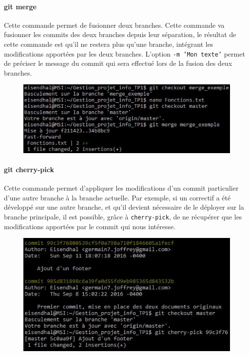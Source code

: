 \documentclass[11pt,canadien]{article}
\begin{document}
\paragraph{git merge}Cette commande permet de fusionner deux branches. Cette commande va fusionner les commits des deux branches depuis leur séparation, le résultat de cette commande est qu'il ne restera plus qu'une branche, intégrant les modifications apportées par les deux branches. L'option \texttt{-m 'Mon texte'} permet de préciser le message du commit qui sera effectué lors de la fusion des deux branches.
\begin{figure}[H]
	\centering
	\includegraphics[width=\textwidth]{images/git_merge.jpg}
\end{figure}

\paragraph{git cherry-pick}Cette commande permet d'appliquer les modifications d'un commit particulier d'une autre branche à la branche actuelle. Par exemple, si un correctif a été développé sur une autre branche, et qu'il devient nécessaire
de le déployer sur la branche principale, il est possible, grâce à \texttt{cherry-pick}, de ne récupérer que les modifications apportées par le commit qui nous intéresse.
\begin{figure}[H]
	\centering
	\includegraphics[width=\textwidth]{images/git_cherry-pick.jpg}
\end{figure}
\end{document}
